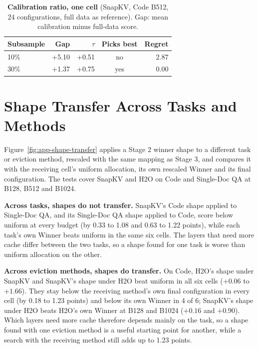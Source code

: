 \begin{table}[!htbp]
  \centering
  \footnotesize
  \setlength{\tabcolsep}{4pt}
  \begin{tabular}{@{}l r r c r@{}}
    \toprule
    Subsample & Gap & $\tau$ & Picks best & Regret \\
    \midrule
    10\% & +5.10 & +0.51 & no & 2.87 \\
    30\% & +1.37 & +0.75 & yes & 0.00 \\
    \bottomrule
  \end{tabular}
  \caption{\textbf{Calibration ratio, one cell} (SnapKV, Code B512, 24 configurations, full data as reference). Gap: mean calibration minus full-data score.}
  \label{tab:app-calib-ratio}
\end{table}


\section{Shape Transfer Across Tasks and Methods}
\label{app:transfer}


Figure~\ref{fig:app-shape-transfer} applies a Stage 2 winner shape to a different task or eviction method, rescaled with the same mapping as Stage 3, and compares it with the receiving cell's uniform allocation, its own rescaled Winner and its final configuration. The tests cover SnapKV and H2O on Code and Single-Doc QA at B128, B512 and B1024.

\textbf{Across tasks, shapes do not transfer.} SnapKV's Code shape applied to Single-Doc QA, and its Single-Doc QA shape applied to Code, score below uniform at every budget (by 0.33 to 1.08 and 0.63 to 1.22 points), while each task's own Winner beats uniform in the same six cells. The layers that need more cache differ between the two tasks, so a shape found for one task is worse than uniform allocation on the other.

\textbf{Across eviction methods, shapes do transfer.} On Code, H2O's shape under SnapKV and SnapKV's shape under H2O beat uniform in all six cells ($+0.06$ to $+1.66$). They stay below the receiving method's own final configuration in every cell (by 0.18 to 1.23 points) and below its own Winner in 4 of 6; SnapKV's shape under H2O beats H2O's own Winner at B128 and B1024 ($+0.16$ and $+0.90$). Which layers need more cache therefore depends mainly on the task, so a shape found with one eviction method is a useful starting point for another, while a search with the receiving method still adds up to 1.23 points.

